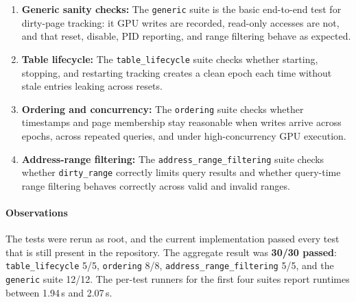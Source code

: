 \begin{enumerate}
    \item \textbf{Generic sanity checks:}
          The \texttt{generic} suite is the basic end-to-end test for dirty-page
          tracking: it GPU writes are recorded, read-only accesses are not,
          and that reset, disable, PID reporting, and range filtering behave as expected.

    \item \textbf{Table lifecycle:}
          The \texttt{table\_lifecycle} suite checks whether starting, stopping, and
          restarting tracking creates a clean epoch each time without stale entries
          leaking across resets.

    \item \textbf{Ordering and concurrency:}
          The \texttt{ordering} suite checks whether timestamps and page membership stay
          reasonable when writes arrive across epochs, across repeated queries, and under
          high-concurrency GPU execution.

    \item \textbf{Address-range filtering:}
          The \texttt{address\_range\_filtering} suite checks whether
          \texttt{dirty\_range} correctly limits query results and whether query-time
          range filtering behaves correctly across valid and invalid ranges.
\end{enumerate}

\paragraph{Observations}
The tests were rerun as root, and the current implementation passed every test
that is still present in the repository. The aggregate result was
\textbf{30/30 passed}: \texttt{table\_lifecycle} 5/5,
\texttt{ordering} 8/8, \texttt{address\_range\_filtering} 5/5, 
and the \texttt{generic} suite 12/12. The per-test
runners for the first four suites report runtimes between 1.94\,s and 2.07\,s.

